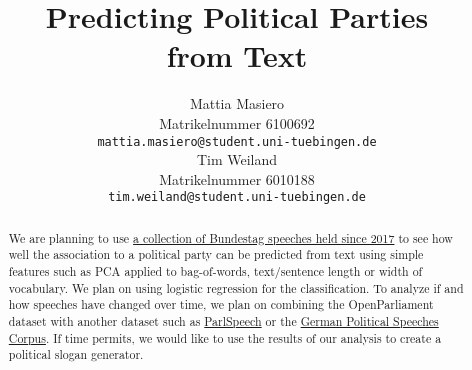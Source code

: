 \documentclass{article}
\title{Predicting Political Parties\\ from Text}
\author{%
  Mattia Masiero\\
  Matrikelnummer 6100692\\
  \texttt{mattia.masiero@student.uni-tuebingen.de} \\
  \And
  Tim Weiland\\
  Matrikelnummer 6010188\\
  \texttt{tim.weiland@student.uni-tuebingen.de} \\
}
\begin{document}
\maketitle

\begin{abstract}
  We are planning to use \href{https://de.openparliament.tv/}{a collection of Bundestag speeches held since 2017} to see how well the association to a political party can be predicted from text using simple features such as PCA applied to bag-of-words, text/sentence length or width of vocabulary. We plan on using logistic regression for the classification. To analyze if and how speeches have changed over time, we plan on combining the OpenParliament dataset with another dataset such as \href{https://dataverse.harvard.edu/dataset.xhtml?persistentId=doi:10.7910/DVN/E4RSP9}{ParlSpeech} or the \href{https://politische-reden.eu/}{German Political Speeches Corpus}. If time permits, we would like to use the results of our analysis to create a political slogan generator.
\end{abstract}
\end{document}
